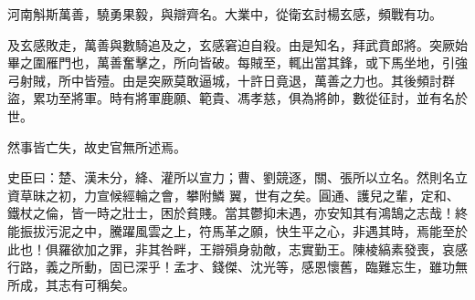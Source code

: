 \begin{pinyinscope}
 河南斛斯萬善，驍勇果毅，與辯齊名。大業中，從衛玄討楊玄感，頻戰有功。



 及玄感敗走，萬善與數騎追及之，玄感窘迫自殺。由是知名，拜武賁郎將。突厥始畢之圍雁門也，萬善奮擊之，所向皆破。每賊至，輒出當其鋒，或下馬坐地，引強弓射賊，所中皆殪。由是突厥莫敢逼城，十許日竟退，萬善之力也。其後頻討群盜，累功至將軍。時有將軍鹿願、範貴、馮孝慈，俱為將帥，數從征討，並有名於世。



 然事皆亡失，故史官無所述焉。



 史臣曰：楚、漢未分，絳、灌所以宣力；曹、劉競逐，關、張所以立名。然則名立資草昧之初，力宣候經輪之會，攀附鱗
 翼，世有之矣。圓通、護兒之輩，定和、鐵杖之倫，皆一時之壯士，困於貧賤。當其鬱抑未遇，亦安知其有鴻鵠之志哉！終能振拔污泥之中，騰躍風雲之上，符馬革之願，快生平之心，非遇其時，焉能至於此也！俱羅欲加之罪，非其咎畔，王辯殞身勍敵，志實勤王。陳棱縞素發喪，哀感行路，義之所動，固已深乎！孟才、錢傑、沈光等，感恩懷舊，臨難忘生，雖功無所成，其志有可稱矣。



\end{pinyinscope}